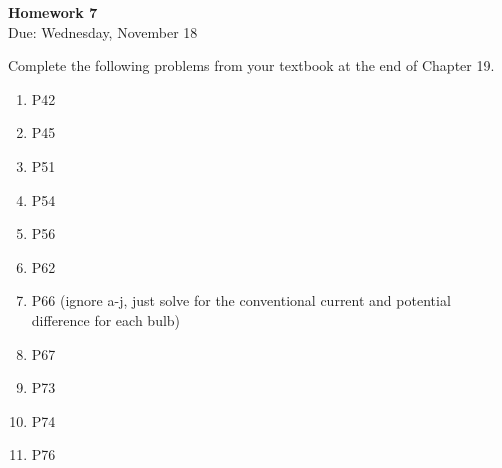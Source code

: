 \documentclass{article}
\begin{document}
\fancyfoot[C]{\thepage}
\vspace*{0cm}
\begin{center}
	{\LARGE \textbf{Homework 7}}\\
	\vspace{0.25cm}
	{\Large Due: Wednesday, November 18}
\end{center}

Complete the following problems from your textbook at the end of Chapter 19.
\begin{enumerate}
\item P42 
\item P45
\item P51
\item P54
\item P56
\item P62
\item P66 (ignore a-j, just solve for the conventional current and potential difference for each bulb)
\item P67
\item P73
\item P74
\item P76
\end{enumerate}
\end{document}
